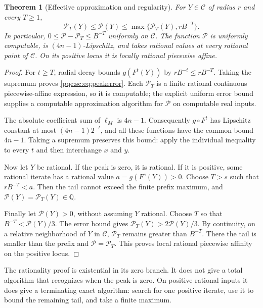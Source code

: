 \documentclass[11pt,letterpaper]{article}
\numberwithin{equation}{section}
\newtheorem{theorem}{Theorem}[section]
\theoremstyle{definition}
\theoremstyle{remark}
\newcommand{\Q}{\mathbb Q}
\newcommand{\Cone}{\mathcal C}
\newcommand{\Peak}{\mathcal P}
\begin{document}
\begin{theorem}[Effective approximation and regularity]\label{pqc:sc:thm:peakregular}
For $Y\in\Cone$ of radius $r$ and every $T\ge1$,
\begin{equation}\label{pqc:sc:eq:peakerror}
 \Peak_T(Y)\le\Peak(Y)\le
       \max\{\Peak_T(Y),rB^{-T}\}.
\end{equation}
In particular, $0\le\Peak-\Peak_T\le B^{-T}$ uniformly on $\Cone$.
The function $\Peak$ is uniformly computable, is $(4n-1)$-Lipschitz,
and takes rational values at every rational point of $\Cone$.
On its positive locus it is locally rational piecewise affine.
\end{theorem}
\begin{proof}
For $t\ge T$, radial decay bounds $g(F^t(Y))$ by $rB^{-t}\le rB^{-T}$.
Taking the supremum proves \eqref{pqc:sc:eq:peakerror}. Each $\Peak_T$ is a finite
rational continuous piecewise-affine expression, so it is computable; the
explicit uniform error bound supplies a computable approximation algorithm
for $\Peak$ on computable real inputs.

The absolute coefficient sum of $\ell_M$ is $4n-1$. Consequently
$g\circ F^t$ has Lipschitz constant at most $(4n-1)2^{-t}$, and all these
functions have the common bound $4n-1$. Taking a supremum preserves this
bound: apply the individual inequality to every $t$ and then interchange
$x$ and $y$.

Now let $Y$ be rational. If the peak is zero, it is rational. If it is
positive, some rational iterate has a rational value $a=g(F^s(Y))>0$.
Choose $T>s$ such that $rB^{-T}<a$. Then the tail cannot exceed the finite
prefix maximum, and $\Peak(Y)=\Peak_T(Y)\in\Q$.

Finally let $\Peak(Y)>0$, without assuming $Y$ rational. Choose $T$ so that
$B^{-T}<\Peak(Y)/3$. The error bound gives
$\Peak_T(Y)>2\Peak(Y)/3$. By continuity, on a relative neighborhood of
$Y$ in $\Cone$, $\Peak_T$ remains greater than $B^{-T}$.
There the tail is smaller than the prefix and $\Peak=\Peak_T$.
This proves local rational piecewise affinity on the positive locus.
\end{proof}

The rationality proof is existential in its zero branch. It does not give a
total algorithm that recognizes when the peak is zero. On positive rational
inputs it does give a terminating exact algorithm: search for one positive
iterate, use it to bound the remaining tail, and take a finite maximum.
\end{document}
